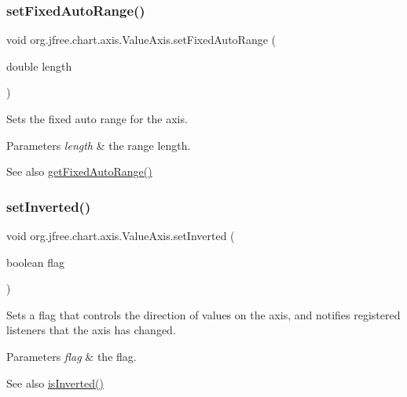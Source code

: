 \subsubsection{\texorpdfstring{set\+Fixed\+Auto\+Range()}{setFixedAutoRange()}}
{\footnotesize\ttfamily void org.\+jfree.\+chart.\+axis.\+Value\+Axis.\+set\+Fixed\+Auto\+Range (\begin{DoxyParamCaption}\item[{double}]{length }\end{DoxyParamCaption})}

Sets the fixed auto range for the axis.


\begin{DoxyParams}{Parameters}
{\em length} & the range length.\\
\hline
\end{DoxyParams}
\begin{DoxySeeAlso}{See also}
\mbox{\hyperlink{classorg_1_1jfree_1_1chart_1_1axis_1_1_value_axis_a6b0e72b7c1c1964aff3ac2a854820fb7}{get\+Fixed\+Auto\+Range()}} 
\end{DoxySeeAlso}
\mbox{\label{classorg_1_1jfree_1_1chart_1_1axis_1_1_value_axis_af1d2e514f72c75bab68872d87ad9ee50}} 
\subsubsection{\texorpdfstring{set\+Inverted()}{setInverted()}}
{\footnotesize\ttfamily void org.\+jfree.\+chart.\+axis.\+Value\+Axis.\+set\+Inverted (\begin{DoxyParamCaption}\item[{boolean}]{flag }\end{DoxyParamCaption})}

Sets a flag that controls the direction of values on the axis, and notifies registered listeners that the axis has changed.


\begin{DoxyParams}{Parameters}
{\em flag} & the flag.\\
\hline
\end{DoxyParams}
\begin{DoxySeeAlso}{See also}
\mbox{\hyperlink{classorg_1_1jfree_1_1chart_1_1axis_1_1_value_axis_a61493fa28db9f869172d67b1205e2793}{is\+Inverted()}} 
\end{DoxySeeAlso}
\mbox{\label{classorg_1_1jfree_1_1chart_1_1axis_1_1_value_axis_a780dc600f43e8e1df3353ed44d77b0a8}} 
